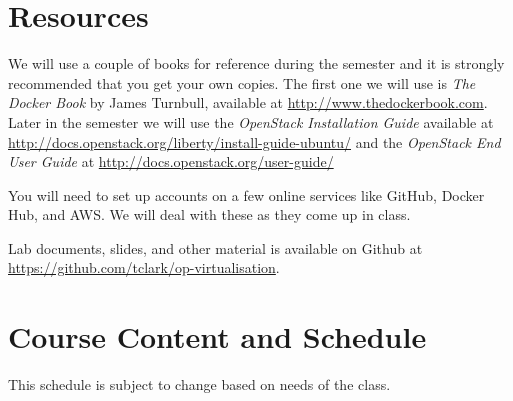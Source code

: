 \documentclass{article}
\begin{document}
\section*{Resources}
We will use a couple of books for reference during the semester and it is strongly recommended that you get your own copies.  The first one we will use is \emph{The Docker Book} by James Turnbull, available at \url{http://www.thedockerbook.com}. Later in the semester we will use the \emph{OpenStack Installation Guide} available at \url{http://docs.openstack.org/liberty/install-guide-ubuntu/} and the \emph{OpenStack End User Guide} at \url{http://docs.openstack.org/user-guide/}

You will need to set up accounts on a few online services like GitHub, Docker Hub, and AWS.  We will deal with these as they come up in class.

Lab documents, slides, and other material is available on Github at \url{https://github.com/tclark/op-virtualisation}.

\newpage 

\section*{Course Content and Schedule}
This schedule is subject to change based on needs of the class.
\end{document}
